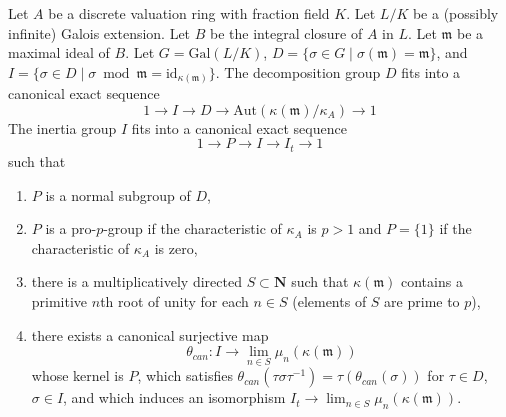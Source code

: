 %
\begin{lemma}
\label{lemma-structure-decomposition}
Let $A$ be a discrete valuation ring with fraction field $K$.
Let $L/K$ be a (possibly infinite) Galois extension.
Let $B$ be the integral closure of $A$ in $L$.
Let $\mathfrak m$ be a maximal ideal of $B$.
Let $G = \text{Gal}(L/K)$,
$D = \{\sigma \in G \mid \sigma(\mathfrak m) = \mathfrak m\}$, and
$I = \{\sigma \in D \mid \sigma \bmod \mathfrak m =
\text{id}_{\kappa(\mathfrak m)}\}$.
The decomposition group $D$ fits into a canonical exact sequence
$$
1 \to I \to D \to \text{Aut}(\kappa(\mathfrak m)/\kappa_A) \to 1
$$
The inertia group $I$ fits into a canonical exact sequence
$$
1 \to P \to I \to I_t \to 1
$$
such that
\begin{enumerate}
\item $P$ is a normal subgroup of $D$,
\item $P$ is a pro-$p$-group if the characteristic of
$\kappa_A$ is $p > 1$ and $P = \{1\}$ if the characteristic of $\kappa_A$
is zero,
\item there is a multiplicatively directed $S \subset \mathbf{N}$
such that $\kappa(\mathfrak m)$ contains a primitive $n$th root of unity
for each $n \in S$ (elements of $S$ are prime to $p$),
\item there exists a canonical surjective map
$$
\theta_{can} : I \to \lim_{n \in S} \mu_n(\kappa(\mathfrak m))
$$
whose kernel is $P$, which satisfies
$\theta_{can}(\tau \sigma \tau^{-1}) = \tau(\theta_{can}(\sigma))$
for $\tau \in D$, $\sigma \in I$, and which induces an isomorphism
$I_t \to \lim_{n \in S} \mu_n(\kappa(\mathfrak m))$.
\end{enumerate}
\end{lemma}

